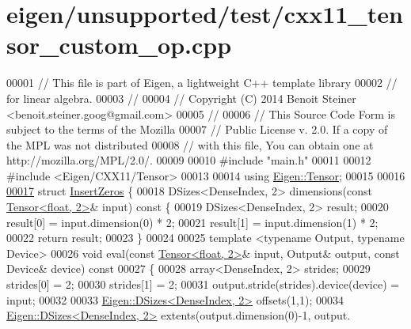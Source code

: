 \hypertarget{eigen_2unsupported_2test_2cxx11__tensor__custom__op_8cpp_source}{}\section{eigen/unsupported/test/cxx11\+\_\+tensor\+\_\+custom\+\_\+op.cpp}
\label{eigen_2unsupported_2test_2cxx11__tensor__custom__op_8cpp_source}

\begin{DoxyCode}
00001 \textcolor{comment}{// This file is part of Eigen, a lightweight C++ template library}
00002 \textcolor{comment}{// for linear algebra.}
00003 \textcolor{comment}{//}
00004 \textcolor{comment}{// Copyright (C) 2014 Benoit Steiner <benoit.steiner.goog@gmail.com>}
00005 \textcolor{comment}{//}
00006 \textcolor{comment}{// This Source Code Form is subject to the terms of the Mozilla}
00007 \textcolor{comment}{// Public License v. 2.0. If a copy of the MPL was not distributed}
00008 \textcolor{comment}{// with this file, You can obtain one at http://mozilla.org/MPL/2.0/.}
00009 
00010 \textcolor{preprocessor}{#include "main.h"}
00011 
00012 \textcolor{preprocessor}{#include <Eigen/CXX11/Tensor>}
00013 
00014 \textcolor{keyword}{using} \hyperlink{class_eigen_1_1_tensor}{Eigen::Tensor};
00015 
00016 
\hyperlink{struct_insert_zeros}{00017} \textcolor{keyword}{struct }\hyperlink{struct_insert_zeros}{InsertZeros} \{
00018   DSizes<DenseIndex, 2> dimensions(\textcolor{keyword}{const} \hyperlink{class_eigen_1_1_tensor}{Tensor<float, 2>}& input)\textcolor{keyword}{ const }\{
00019     DSizes<DenseIndex, 2> result;
00020     result[0] = input.dimension(0) * 2;
00021     result[1] = input.dimension(1) * 2;
00022     \textcolor{keywordflow}{return} result;
00023   \}
00024 
00025   \textcolor{keyword}{template} <\textcolor{keyword}{typename} Output, \textcolor{keyword}{typename} Device>
00026   \textcolor{keywordtype}{void} eval(\textcolor{keyword}{const} \hyperlink{class_eigen_1_1_tensor}{Tensor<float, 2>}& input, Output& output, \textcolor{keyword}{const} Device& device)\textcolor{keyword}{ const}
00027 \textcolor{keyword}{  }\{
00028     array<DenseIndex, 2> strides;
00029     strides[0] = 2;
00030     strides[1] = 2;
00031     output.stride(strides).device(device) = input;
00032 
00033     \hyperlink{struct_eigen_1_1_d_sizes}{Eigen::DSizes<DenseIndex, 2>} offsets(1,1);
00034     \hyperlink{struct_eigen_1_1_d_sizes}{Eigen::DSizes<DenseIndex, 2>} extents(output.dimension(0)-1, output.

\end{DoxyCode}
